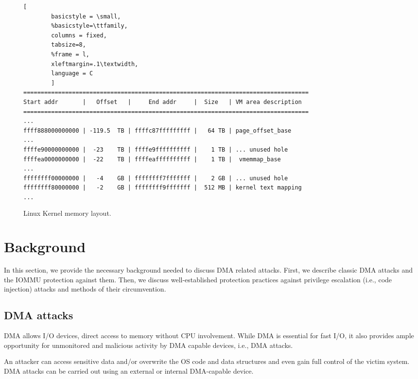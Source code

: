 \begin{figure*}[t]

        \begin{lstlisting}[
        basicstyle = \small,
        %basicstyle=\ttfamily,
        columns = fixed,
        tabsize=8,
        %frame = l,
        xleftmargin=.1\textwidth,
        language = C
        ]
==================================================================================
Start addr       |   Offset   |     End addr     |  Size   | VM area description
==================================================================================
...
ffff888000000000 | -119.5  TB | ffffc87fffffffff |   64 TB | page_offset_base
...
ffffe90000000000 |  -23    TB | ffffe9ffffffffff |    1 TB | ... unused hole
ffffea0000000000 |  -22    TB | ffffeaffffffffff |    1 TB |  vmemmap_base
...
ffffffff00000000 |   -4    GB | ffffffff7fffffff |    2 GB | ... unused hole
ffffffff80000000 |   -2    GB | ffffffff9fffffff |  512 MB | kernel text mapping
...
                \end{lstlisting}
        \caption{ Linux Kernel memory layout.}
        \label{fig:mem_layot}

\end{figure*}

\section{Background}

In this section, we provide the necessary background needed to discuss DMA related attacks. First, we describe classic DMA attacks and the IOMMU protection against them. Then, we discuss well-established protection practices against privilege escalation (i.e., code injection) attacks and methods of their circumvention.

\subsection{DMA attacks}

DMA allows I/O devices, direct access to memory \cite{oC54} without CPU involvement. While DMA is essential for fast I/O, it also provides ample opportunity for unmonitored and malicious activity by DMA capable devices, i.e., DMA attacks. 

An attacker can access sensitive data and/or overwrite the OS code and data structures and even gain full control of the victim system. DMA attacks can be carried out using an external or internal DMA-capable device. 

